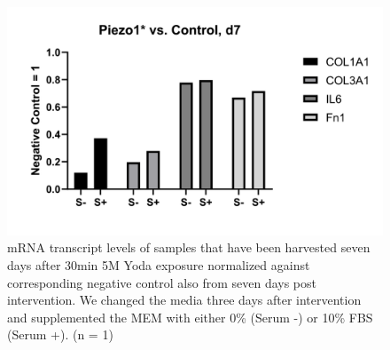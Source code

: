 \begin{figure}
	\centering
	\includegraphics[width = \linewidth{}]{LongTerm_PCR.png}
	\caption{mRNA transcript levels of samples that have been harvested seven days after 30min 5\textmu{}M Yoda exposure normalized against corresponding negative control also from seven days post intervention. We changed the media three days after \Yoda intervention and supplemented the MEM\textalpha{} with either 0\% (Serum -) or 10\% FBS (Serum +). (n = 1)}
	\label{fig:LongTerm_PCR}
\end{figure}

